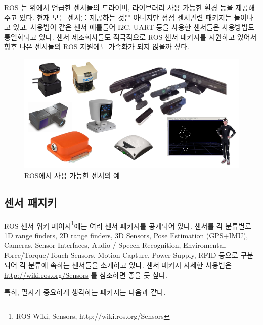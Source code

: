 ROS 는 위에서 언급한 센서들의 드라이버, 라이브러리 사용 가능한 환경 등을 제공해주고 있다. 현재 모든 센서를 제공하는 것은 아니지만 점점 센서관련 패키지는 늘어나고 있고, 사용법이 같은 센서 예를들어 I2C, UART 등을 사용한 센서들은 사용방법도 통일화되고 있다. 센서 제조회사들도 적극적으로 ROS 센서 패키지를 지원하고 있어서 향후 나온 센서들의 ROS 지원에도 가속화가 되지 않을까 싶다.

\begin{figure}[h]
\centering\includegraphics[width=0.8\columnwidth]{pictures/chapter8/sensors.png}
\caption{ROS에서 사용 가능한 센서의 예}
\end{figure}

\subsection{센서 패지키}

ROS 센서 위키 페이지\footnote{ROS Wiki, Sensors, http://wiki.ros.org/Sensors}에는 여러 센서 패키지를 공개되어 있다. 센서를 각 분류별로 1D range finders, 2D range finders, 3D Sensors, Pose Estimation (GPS+IMU), Cameras, Sensor Interfaces, Audio / Speech Recognition, Enviromental, Force/Torque/Touch Sensors, Motion Capture, Power Supply, RFID 등으로 구분되어 각 분류에 속하는 센서들을 소개하고 있다. 센서 패키지 자세한 사용법은 \url{http://wiki.ros.org/Sensors} 를 참조하면 좋을 듯 싶다.

\noindent
특히, 필자가 중요하게 생각하는 패키지는 다음과 같다.

